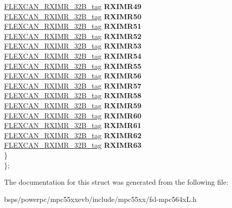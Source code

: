 \begin{DoxyCompactItemize}
\begin{tabbing}
\>\>\mbox{\hyperlink{unionFLEXCAN__RXIMR__32B__tag}{FLEXCAN\_RXIMR\_32B\_tag}} {\bfseries RXIMR49}\\
\>\>\mbox{\hyperlink{unionFLEXCAN__RXIMR__32B__tag}{FLEXCAN\_RXIMR\_32B\_tag}} {\bfseries RXIMR50}\\
\>\>\mbox{\hyperlink{unionFLEXCAN__RXIMR__32B__tag}{FLEXCAN\_RXIMR\_32B\_tag}} {\bfseries RXIMR51}\\
\>\>\mbox{\hyperlink{unionFLEXCAN__RXIMR__32B__tag}{FLEXCAN\_RXIMR\_32B\_tag}} {\bfseries RXIMR52}\\
\>\>\mbox{\hyperlink{unionFLEXCAN__RXIMR__32B__tag}{FLEXCAN\_RXIMR\_32B\_tag}} {\bfseries RXIMR53}\\
\>\>\mbox{\hyperlink{unionFLEXCAN__RXIMR__32B__tag}{FLEXCAN\_RXIMR\_32B\_tag}} {\bfseries RXIMR54}\\
\>\>\mbox{\hyperlink{unionFLEXCAN__RXIMR__32B__tag}{FLEXCAN\_RXIMR\_32B\_tag}} {\bfseries RXIMR55}\\
\>\>\mbox{\hyperlink{unionFLEXCAN__RXIMR__32B__tag}{FLEXCAN\_RXIMR\_32B\_tag}} {\bfseries RXIMR56}\\
\>\>\mbox{\hyperlink{unionFLEXCAN__RXIMR__32B__tag}{FLEXCAN\_RXIMR\_32B\_tag}} {\bfseries RXIMR57}\\
\>\>\mbox{\hyperlink{unionFLEXCAN__RXIMR__32B__tag}{FLEXCAN\_RXIMR\_32B\_tag}} {\bfseries RXIMR58}\\
\>\>\mbox{\hyperlink{unionFLEXCAN__RXIMR__32B__tag}{FLEXCAN\_RXIMR\_32B\_tag}} {\bfseries RXIMR59}\\
\>\>\mbox{\hyperlink{unionFLEXCAN__RXIMR__32B__tag}{FLEXCAN\_RXIMR\_32B\_tag}} {\bfseries RXIMR60}\\
\>\>\mbox{\hyperlink{unionFLEXCAN__RXIMR__32B__tag}{FLEXCAN\_RXIMR\_32B\_tag}} {\bfseries RXIMR61}\\
\>\>\mbox{\hyperlink{unionFLEXCAN__RXIMR__32B__tag}{FLEXCAN\_RXIMR\_32B\_tag}} {\bfseries RXIMR62}\\
\>\>\mbox{\hyperlink{unionFLEXCAN__RXIMR__32B__tag}{FLEXCAN\_RXIMR\_32B\_tag}} {\bfseries RXIMR63}\\
\>\} \\
\}; \\

\end{tabbing}\end{DoxyCompactItemize}


The documentation for this struct was generated from the following file\+:\begin{DoxyCompactItemize}
\item 
bsps/powerpc/mpc55xxevb/include/mpc55xx/fsl-\/mpc564x\+L.\+h\end{DoxyCompactItemize}
